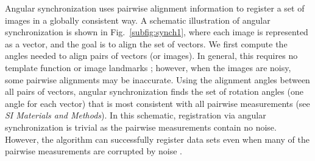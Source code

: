 \documentclass{pnastwo}
\newcommand{\fig}[0]{Fig.}
\begin{document}
\begin{article}
Angular synchronization uses pairwise alignment information to register a set of images in a globally consistent way.
%
A schematic illustration of angular synchronization is shown in \fig~\ref{subfig:synch1}, where each image is represented as a vector, and the goal is to align the set of vectors.
%
We first compute the angles needed to align pairs of vectors (or images).  
%
In general, this requires no template function \cite{ahuja2007template} or image landmarks \cite{ian1998statistical};
however, when the images are noisy, some pairwise alignments may be inaccurate.
%
Using the alignment angles between all pairs of vectors, angular synchronization finds the set of rotation angles (one angle for each vector) that is most consistent with all pairwise measurements (see {\it SI Materials and Methods}).
%
In this schematic, registration via angular synchronization is trivial as the pairwise measurements contain no noise.
%
However, the algorithm can successfully register data sets even when many of the pairwise measurements are corrupted by noise \cite{singer2011angular}.
%


\end{article}
\end{document}
